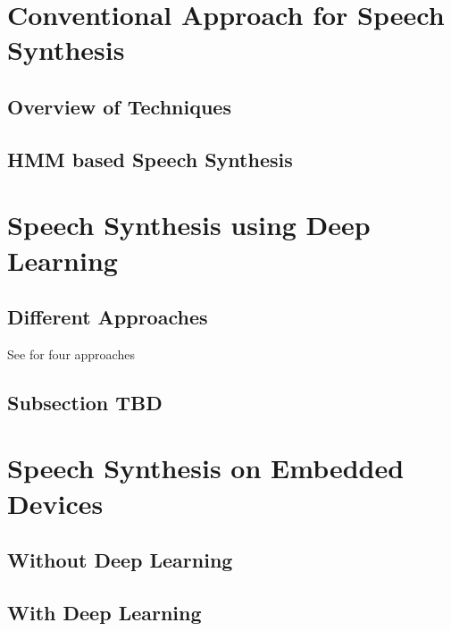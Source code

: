 
\section{Conventional Approach for Speech Synthesis}

\subsection{Overview of Techniques}

\blindtext

\subsection{HMM based Speech Synthesis}

\blindtext

\section{Speech Synthesis using Deep Learning}

\subsection{Different Approaches}

See \cite[page 20]{li:survey} for four approaches

\vspace{1em}

\blindtext

\subsection{Subsection TBD}

\blindtext

\section{Speech Synthesis on Embedded Devices}

\subsection{Without Deep Learning}

\blindtext

\subsection{With Deep Learning}

\blindtext